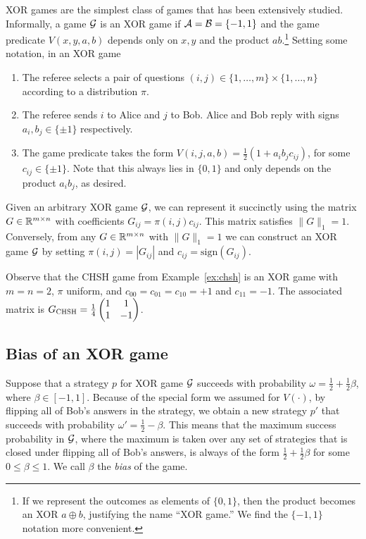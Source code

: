 XOR games are the simplest class of games that has been extensively studied. Informally, a game $\mathcal{G}$ is an XOR game if $\mathcal{A}=\mathcal{B}=\{-1,1\}$ and the game predicate $V(x,y,a,b)$ depends only on $x,y$ and the product $a b$.\footnote{If we represent the outcomes as elements of $\{0,1\}$, then the product becomes an XOR $a\oplus b$, justifying the name ``XOR game.'' We find the $\{-1,1\}$ notation more convenient.} Setting some notation, in an XOR game
\begin{enumerate}
  \item The referee selects a pair of questions $(i,j)\in \{1,\ldots, m\}\times \{1,\ldots, n\}$
   according to a distribution $\pi$. 
  \item The referee sends $i$ to Alice and $j$ to Bob. Alice and Bob reply with signs $a_i,b_j\in\{\pm 1\}$ respectively.
  \item The game predicate takes the form $V(i,j,a,b)=\frac{1}{2}(1+a_ib_jc_{ij})$, for some $c_{ij}\in\{\pm 1\}$. Note that this always lies in $\{0,1\}$ and only depends on the product $a_ib_j$, as desired. 
\end{enumerate}
Given an arbitrary XOR game $\cal G$, we can represent it succinctly using the matrix $G\in\mathbb{R}^{m\times n}$ with coefficients $G_{ij}=\pi(i,j)c_{ij}$. This matrix satisfies $\|G\|_1=1$. Conversely, from any $G\in \mathbb{R}^{m\times n}$ with $\|G\|_1=1$ we can construct an XOR game $\cal G$ by setting $\pi(i,j)=|G_{ij}|$ and $c_{ij}=\text{sign}(G_{ij})$. 

Observe that the CHSH game from Example~\ref{ex:chsh} is an XOR game with $m=n=2$, $\pi$ uniform, and $c_{00}=c_{01}=c_{10}=+1$ and $c_{11}=-1$. The associated matrix is $G_{\textsc{CHSH}}=\frac{1}{4}\begin{pmatrix} 1 & 1 \\ 1 & -1\end{pmatrix}$. 

\subsection{Bias of an XOR game}

Suppose that a strategy $p$ for XOR game $\mathcal{G}$ succeeds with probability $\omega = \frac{1}{2}+\frac{1}{2}\beta$, where $\beta\in[-1,1]$. Because of the special form we assumed for $V(\cdot)$, by flipping all of Bob's answers in the strategy, we obtain a new strategy $p'$ that succeeds with probability $\omega'=\frac{1}{2}-\beta$. This means that the maximum success probability in $\mathcal{G}$, where the maximum is taken over any set of strategies that is closed under flipping all of Bob's answers, is always of the form $\frac{1}{2}+\frac{1}{2}\beta$ for some $0\leq \beta\leq 1$. We call $\beta$ the \emph{bias} of the game. 


